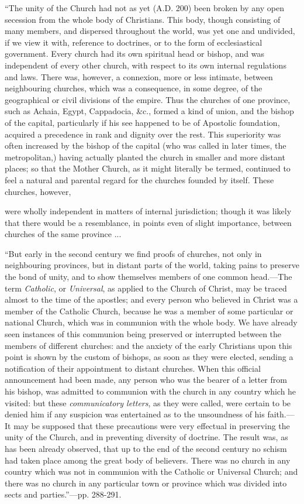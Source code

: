``The
unity of the Church had not as yet (A.D. 200) been broken by any open secession from the whole body of
Christians. This body, though consisting of many members, and dispersed
throughout the world, was yet one and undivided, if we view it with,
reference to doctrines, or to the form of ecclesiastical government.
Every church had its own spiritual head or bishop, and was independent
of every other church, with respect to its own internal regulations and
laws. There was, however, a connexion, more or less intimate, between
neighbouring churches, which was a consequence, in some degree, of the
geographical or civil divisions of the empire. Thus the churches of one
province, such as Achaia, Egypt, Cappadocia, \&c., formed a kind of
union, and the bishop of the capital, particularly if his see happened
to be of Apostolic foundation, acquired a precedence in rank and dignity
over the rest. This superiority was often increased by the bishop of the
capital (who was called in later times, the metropolitan,) having
actually planted the church in smaller and more distant places; so that
the Mother Church, as it might literally be termed, continued to feel a
natural and parental regard for the churches founded by itself. These
churches, however,

were wholly independent in matters of internal
jurisdiction; though it was likely that there would be a resemblance, in
points even of slight importance, between churches of the same province
...

``But
early in the second century we find proofs of churches, not only in
neighbouring provinces, but in distant parts of the world, taking pains
to preserve the bond of unity, and to show themselves members of one
common head.—The term \emph{Catholic}, or \emph{Universal}, as applied
to the Church of Christ, may be traced almost to the time of the
apostles; and every person who believed in Christ was a member of the
Catholic Church, because he was a member of some particular or national
Church, which was in communion with the whole body. We have already seen
instances of this communion being preserved or interrupted between the
members of different churches: and the anxiety of the early Christians
upon this point is shown by the custom of bishops, as soon as they were
elected, sending a notification of their appointment to distant
churches. When this official announcement had been made, any person who
was the bearer of a letter from his bishop, was admitted to communion
with the church in any country which he visited: but these \emph{communicatory
letters}, as they were called, were certain to be denied him if any
suspicion was entertained as to the unsoundness of his faith.—It may
be supposed that these precautions were very effectual in preserving the
unity of the Church, and in preventing diversity of doctrine. The result
was, as has been already observed, that up to the end of the second
century no schism had taken place among the great body of believers.
There was no church in any country which was not in communion with the
Catholic or Universal Church; and there was no church in any particular
town or province which was divided into sects and parties.''—pp.
288-291.

